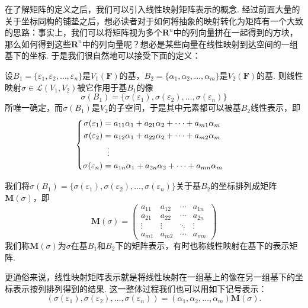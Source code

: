 在了解矩阵的定义之后，我们可以引入线性映射矩阵表示的概念. 经过前面大量的关于坐标同构的铺垫之后，想必读者对于如何将抽象的映射转化为矩阵有一个大致的思路：事实上，我们可以将矩阵视为多个$\mathbf{R}^n$中的列向量拼在一起得到的方块，那么如何得到这些$\mathbf{R}^n$中的列向量呢？想必是某些向量在线性映射到达空间的一组基下的坐标. 于是我们很自然地可以接受下面的定义：
\begin{definition}\label{def:7:线性映射矩阵表示}
    设$B_1=\{\varepsilon_1,\varepsilon_2,\ldots,\varepsilon_n\}$是$V_1(\mathbf{F})$的基，$B_2=\{\alpha_1,\alpha_2,\ldots,\alpha_m\}$是$V_2(\mathbf{F})$的基. 则线性映射$\sigma \in \mathcal{L}(V_1,V_2)$被它作用于基$B_1$的像
    \[\sigma(B_1)=\{\sigma(\varepsilon_1),\sigma(\varepsilon_2),\ldots,\sigma(\varepsilon_n)\}\]
    所唯一确定，而$\sigma(B_1)$是$V_2$的子空间，于是其中元素都可以被基$B_2$线性表示，即
    \[ \begin{cases} \begin{aligned}
                \sigma(\varepsilon_1) & = a_{11}\alpha_1+a_{21}\alpha_2+\cdots+a_{m1}\alpha_m \\
                \sigma(\varepsilon_2) & = a_{12}\alpha_1+a_{22}\alpha_2+\cdots+a_{m2}\alpha_m \\
                                      & \vdotswithin{=}                                       \\
                \sigma(\varepsilon_n) & = a_{1n}\alpha_1+a_{2n}\alpha_2+\cdots+a_{mn}\alpha_m
            \end{aligned} \end{cases} \]

    我们将$\sigma(B_1)=\{\sigma(\varepsilon_1),\sigma(\varepsilon_2),\ldots,\sigma(\varepsilon_n)\}$关于基$B_2$的坐标排列成矩阵$\mathbf{M}(\sigma)$，即
    \[\mathbf{M}(\sigma)=\begin{pmatrix}
            a_{11} & a_{12} & \cdots & a_{1n} \\
            a_{21} & a_{22} & \cdots & a_{2n} \\
            \vdots & \vdots & \ddots & \vdots \\
            a_{m1} & a_{m2} & \cdots & a_{mn}
        \end{pmatrix}\]
    我们称$\mathbf{M}(\sigma)$为$\sigma$在基$B_1$和$B_2$下的矩阵表示，有时也称线性映射在基下的表示矩阵.
\end{definition}

更通俗来说，线性映射矩阵表示就是将线性映射在一组基上的像在另一组基下的坐标表示按列排列得到的结果. 这一整体过程我们也可以用如下记号表示：
\begin{equation}\label{eq:7:线性映射矩阵表示}
    (\sigma(\varepsilon_1),\sigma(\varepsilon_2),\ldots,\sigma(\varepsilon_n))=(\alpha_1,\alpha_2,\ldots,\alpha_m)\mathbf{M}(\sigma).
\end{equation}

